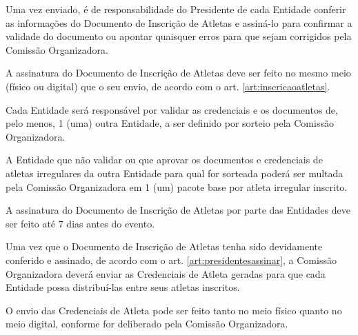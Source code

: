 \begin{article}
    \label{art:presidentesassinar}
    Uma vez enviado, é de responsabilidade do Presidente de cada Entidade conferir as informações do Documento de Inscrição de Atletas e assiná-lo para confirmar a validade do documento ou apontar quaisquer erros para que sejam corrigidos pela Comissão Organizadora.

	\begin{xparagraph}
	    A assinatura do Documento de Inscrição de Atletas deve ser feito no mesmo meio (físico ou digital) que o seu envio, de acordo com o art. \ref{art:inscricaoatletas}\ulo.
	\end{xparagraph}

	\begin{xparagraph}
        Cada Entidade será responsável por validar as credenciais e os documentos de, pelo menos, 1 (uma) outra Entidade, a ser definido por sorteio pela Comissão Organizadora.
	\end{xparagraph}

	\begin{xparagraph}
        A Entidade que não validar ou que aprovar os documentos e credenciais de atletas irregulares da outra Entidade para qual for sorteada poderá ser multada pela Comissão Organizadora em 1 (um) pacote base por atleta irregular inscrito.
	\end{xparagraph}

	\begin{xparagraph}
	    A assinatura do Documento de Inscrição de Atletas por parte das Entidades deve ser feito até 7 dias antes do evento.
	\end{xparagraph}
\end{article}

\begin{article}
    Uma vez que o Documento de Inscrição de Atletas tenha sido devidamente conferido e assinado, de acordo com o art. \ref{art:presidentesassinar}\ulo, a Comissão Organizadora deverá enviar as Credenciais de Atleta geradas para que cada Entidade possa distribuí-las entre seus atletas inscritos.

	\begin{xparagraph}
	    O envio das Credenciais de Atleta pode ser feito tanto no meio físico quanto no meio digital, conforme for deliberado pela Comissão Organizadora.
	\end{xparagraph}
\end{article}

